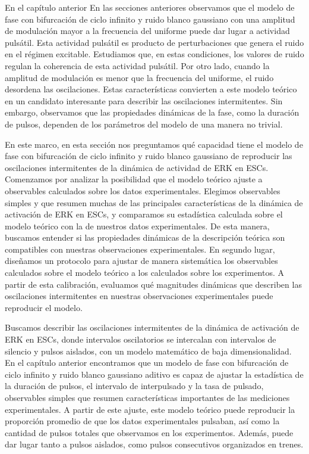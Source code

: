 \documentclass[./main.tex]{subfiles}
\begin{document}
En el capítulo anterior 
En las secciones anteriores observamos que el modelo de fase con bifurcación de ciclo infinito y ruido blanco gaussiano con una amplitud de modulación mayor a la frecuencia del uniforme puede dar lugar a actividad pulsátil. Esta actividad pulsátil es producto de perturbaciones que genera el ruido en el régimen excitable. Estudiamos que, en estas condiciones, los valores de ruido regulan la coherencia de esta actividad pulsátil. Por otro lado, cuando la amplitud de modulación es menor que la frecuencia del uniforme, el ruido desordena las oscilaciones. Estas características convierten a este modelo teórico en un candidato interesante para describir las oscilaciones intermitentes. Sin embargo, observamos que las propiedades dinámicas de la fase, como la duración de pulsos, dependen de los parámetros del modelo de una manera no trivial.  

En este marco, en esta sección nos preguntamos qué capacidad tiene el modelo de fase con bifurcación de ciclo infinito y ruido blanco gaussiano de reproducir las oscilaciones intermitentes de la dinámica de actividad de ERK en ESCs. Comenzamos por analizar la posibilidad que el modelo teórico ajuste a observables calculados sobre los datos experimentales. Elegimos observables simples y que resumen muchas de las principales características de la dinámica de activación de ERK en ESCs, y comparamos su estadística calculada sobre el modelo teórico con la de nuestros datos experimentales. De esta manera, buscamos entender si las propiedades dinámicas de la descripción teórica son compatibles con nuestras observaciones experimentales. En segundo lugar, diseñamos un protocolo para ajustar de manera sistemática los observables calculados sobre el modelo teórico a los calculados sobre los experimentos. A partir de esta calibración, evaluamos qué magnitudes dinámicas que describen las oscilaciones intermitentes en nuestras observaciones experimentales puede reproducir el modelo.



Buscamos describir las oscilaciones intermitentes de la dinámica de activación de ERK en ESCs, donde intervalos oscilatorios se intercalan con intervalos de silencio y pulsos aislados, con un modelo matemático de baja dimensionalidad. En el capítulo anterior encontramos que un modelo de fase con bifurcación de ciclo infinito y ruido blanco gaussiano aditivo es capaz de ajustar la estadística de la duración de pulsos, el intervalo de interpulsado y la tasa de pulsado, observables simples que resumen características importantes de las mediciones experimentales. A partir de este ajuste, este modelo teórico puede reproducir la proporción promedio de que los datos experimentales pulsaban, así como la cantidad de pulsos totales que observamos en los experimentos. Además, puede dar lugar tanto a pulsos aislados, como pulsos consecutivos organizados en trenes. 
\end{document}
